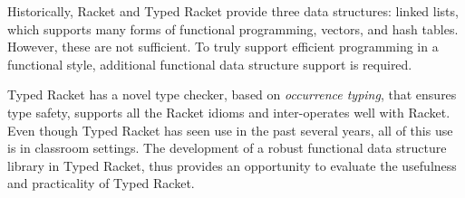 Historically, Racket and Typed Racket provide three data structures:
linked lists, which supports many forms of functional programming,
vectors, and hash tables. However, these are not sufficient. To truly
support efficient programming in a functional style, additional
functional data structure support is required.


Typed Racket has a novel type checker, based on \emph{occurrence
typing}, that ensures type safety, supports all the Racket idioms and
inter-operates well with Racket. Even though Typed Racket has seen use
in the past several years, all of this use is in classroom settings. The
development of a robust functional data structure library in Typed
Racket, thus provides an opportunity to evaluate the usefulness and
practicality of Typed Racket.




%
%
%
%
%
%
%
%
